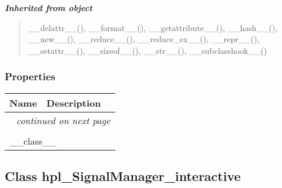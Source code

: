 \large{\textbf{\textit{Inherited from object}}}

\begin{quote}
\_\_delattr\_\_(), \_\_format\_\_(), \_\_getattribute\_\_(), \_\_hash\_\_(), \_\_new\_\_(), \_\_reduce\_\_(), \_\_reduce\_ex\_\_(), \_\_repr\_\_(), \_\_setattr\_\_(), \_\_sizeof\_\_(), \_\_str\_\_(), \_\_subclasshook\_\_()
\end{quote}


  \subsubsection{Properties}

    \vspace{-1cm}
\hspace{\varindent}\begin{longtable}{|p{\varnamewidth}|p{\vardescrwidth}|l}
\cline{1-2}
\cline{1-2} \centering \textbf{Name} & \centering \textbf{Description}& \\
\cline{1-2}
\endhead\cline{1-2}\multicolumn{3}{r}{\small\textit{continued on next page}}\\\endfoot\cline{1-2}
\endlastfoot\multicolumn{2}{|l|}{\textit{Inherited from object}}\\
\multicolumn{2}{|p{\varwidth}|}{\raggedright \_\_class\_\_}\\
\cline{1-2}
\end{longtable}



\subsection{Class hpl\_SignalManager\_interactive}

